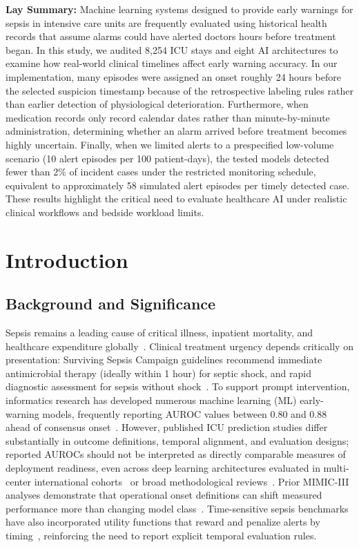 \documentclass[12pt,a4paper]{article}
\begin{document}
\vspace{0.5em}
\noindent\textbf{Lay Summary:}  
Machine learning systems designed to provide early warnings for sepsis in intensive care units are frequently evaluated using historical health records that assume alarms could have alerted doctors hours before treatment began. In this study, we audited 8,254 ICU stays and eight AI architectures to examine how real-world clinical timelines affect early warning accuracy. In our implementation, many episodes were assigned an onset roughly 24 hours before the selected suspicion timestamp because of the retrospective labeling rules rather than earlier detection of physiological deterioration. Furthermore, when medication records only record calendar dates rather than minute-by-minute administration, determining whether an alarm arrived before treatment becomes highly uncertain. Finally, when we limited alerts to a prespecified low-volume scenario (10 alert episodes per 100 patient-days), the tested models detected fewer than 2\% of incident cases under the restricted monitoring schedule, equivalent to approximately 58 simulated alert episodes per timely detected case. These results highlight the critical need to evaluate healthcare AI under realistic clinical workflows and bedside workload limits.

\section{Introduction}

\subsection{Background and Significance}
Sepsis remains a leading cause of critical illness, inpatient mortality, and healthcare expenditure globally~\cite{singer2016sepsis,seymour2016assessment}. Clinical treatment urgency depends critically on presentation: Surviving Sepsis Campaign guidelines recommend immediate antimicrobial therapy (ideally within 1 hour) for septic shock, and rapid diagnostic assessment for sepsis without shock~\cite{evans2021surviving,kumar2006duration}. To support prompt intervention, informatics research has developed numerous machine learning (ML) early-warning models, frequently reporting AUROC values between 0.80 and 0.88 ahead of consensus onset~\cite{moor2021early}. However, published ICU prediction studies differ substantially in outcome definitions, temporal alignment, and evaluation designs; reported AUROCs should not be interpreted as directly comparable measures of deployment readiness, even across deep learning architectures evaluated in multi-center international cohorts~\cite{moor2023predicting} or broad methodological reviews~\cite{wang2025methodological}. Prior MIMIC-III analyses demonstrate that operational onset definitions can shift measured performance more than changing model class~\cite{cohen2024subtle}. Time-sensitive sepsis benchmarks have also incorporated utility functions that reward and penalize alerts by timing~\cite{reyna2020early}, reinforcing the need to report explicit temporal evaluation rules.
\end{document}
